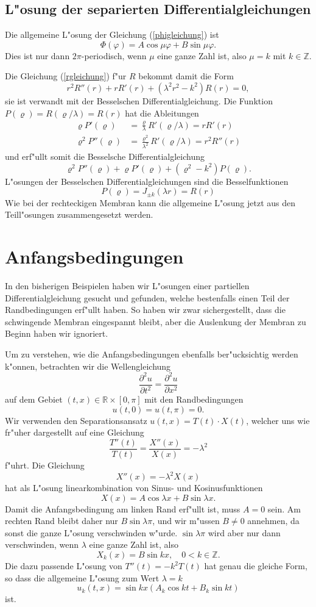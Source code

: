 \subsection{L"osung der separierten Differentialgleichungen}
Die allgemeine L"osung der Gleichung (\ref{phigleichung}) ist
\[
\Phi(\varphi)=A\cos\mu\varphi +B\sin\mu\varphi.
\]
Dies ist nur dann $2\pi$-periodisch, wenn $\mu$ eine ganze
Zahl ist, also $\mu=k$ mit $k\in\mathbb Z$.

Die Gleichung (\ref{rgleichung}) f"ur $R$ bekommt damit die Form
\[
r^2R''(r)+rR'(r)+(\lambda^2 r^2-k^2)R(r)=0,
\]
sie ist verwandt mit der Besselschen Differentialgleichung.
Die Funktion $P(\varrho)=R(\varrho/\lambda)=R(r)$ hat die Ableitungen
\begin{align*}
\varrho P'(\varrho)&=\frac{\varrho}{\lambda}R'(\varrho/\lambda)=rR'(r)\\
\varrho^2 P''(\varrho)&=\frac{\varrho^2}{\lambda^2}R'(\varrho/\lambda)=r^2R''(r)
\end{align*}
und erf"ullt somit die Besselsche Differentialgleichung
\[
\varrho^2P''(\varrho)+\varrho P'(\varrho)+(\varrho^2-k^2)P(\varrho).
\]
L"osungen der Besselschen Differentialgleichungen sind die Besselfunktionen
\[
P(\varrho)=J_{\pm k}(\lambda r)=R(r)
\]
Wie bei der rechteckigen Membran kann die allgemeine L"osung jetzt aus
den Teill"osungen zusammengesetzt werden.

\section{Anfangsbedingungen}
In den bisherigen Beispielen haben wir L"osungen einer partiellen
Differentialgleichung gesucht und gefunden, welche bestenfalls einen
Teil der Randbedingungen erf"ullt haben.
So haben wir zwar sichergestellt, dass die schwingende Membran eingespannt
bleibt, aber die Auslenkung der Membran zu Beginn haben wir ignoriert.

Um zu verstehen, wie die Anfangsbedingungen ebenfalls ber"ucksichtig
werden k"onnen, betrachten wir die Wellengleichung
\[
\frac{\partial^2 u}{\partial t^2}=\frac{\partial^2 u}{\partial x^2}
\]
auf dem Gebiet $(t,x)\in\mathbb R\times [0,\pi]$
mit den Randbedingungen
\[
u(t,0)=u(t,\pi)=0.
\]
Wir verwenden den Separationsansatz
$u(t,x)=T(t)\cdot X(t)$, welcher uns wie fr"uher dargestellt auf eine
Gleichung
\[
\frac{T''(t)}{T(t)}=\frac{X''(x)}{X(x)}=-\lambda^2
\]
f"uhrt.
Die Gleichung 
\[
X''(x)=-\lambda^2 X(x)
\]
hat als L"osung linearkombination von Sinus- und Kosinusfunktionen
\[
X(x)=A\cos\lambda x+B\sin\lambda x.
\]
Damit die Anfangsbedingung am linken Rand erf"ullt ist, muss $A=0$
sein. Am rechten Rand bleibt daher nur $B\sin\lambda \pi$, und wir
m"ussen $B\ne 0$ annehmen, da sonst die ganze L"osung verschwinden
w"urde. $\sin\lambda \pi$ wird aber nur dann verschwinden, wenn
$\lambda$ eine ganze Zahl ist, also
\[
X_k(x)=B\sin kx, \quad 0<k\in\mathbb Z.
\]
Die dazu passende L"osung von $T''(t)=-k^2T(t)$ hat genau die
gleiche Form, so dass die allgemeine L"osung zum Wert $\lambda=k$
\[
u_k(t,x)=\sin kx\left(A_k\cos kt+B_k\sin kt\right)
\]
ist.

